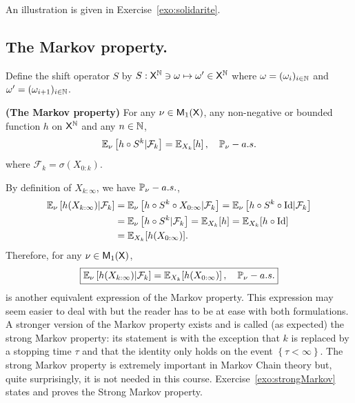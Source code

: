 \documentclass[english,graybox,envcountchap,envcountsame,sectrefs,shortlabels]{svmono}
\theoremstyle{style}
\begin{document}
An illustration is given in Exercise~\ref{exo:solidarite}.
\subsection{The Markov property.} 

Define the shift operator $S$ by $S:\mathsf{X}^{\mathbb{N}}\ni\omega\mapsto\omega'\in\mathsf{X}^{\mathbb{N}}$
where $\omega=(\omega_{i})_{i\in\mathbb{N}}$ and $\omega'=(\omega_{i+1})_{i\in\mathbb{N}}$.


\begin{theorem}
\textbf{(The Markov property)} For any $\nu\in\mathsf{M}_{1}(\mathsf{X})$, any
non-negative or bounded function $h$ on $\mathsf{X}^{\mathbb{N}}$ and any
$n\in\mathbb{N}$,
\begin{equation}
\mathbb{E}_{\nu}\left[h\circ S^{k}|\mathcal{F}_{k}\right]=\mathbb{E}_{X_{k}}[h]\,,\quad\mathbb{P}_{\nu}-a.s.\label{eq:MarkovProperty}
\end{equation}
where $\mathcal{F}_{k}=\sigma(X_{0:k})$.
\end{theorem}


By definition of $X_{k:\infty}$, we have $\mathbb{P}_{\nu}-a.s.$,
\begin{align*}
\mathbb{E}_{\nu}\left[h(X_{k:\infty})|\mathcal{F}_{k}\right] & =\mathbb{E}_{\nu}\left[h\circ S^{k}\circ X_{0:\infty}|\mathcal{F}_{k}\right]=\mathbb{E}_{\nu}\left[h\circ S^{k}\circ \mathrm{Id}|\mathcal{F}_{k}\right]\\
 & =\mathbb{E}_{\nu}\left[h\circ S^{k}|\mathcal{F}_{k}\right]=\mathbb{E}_{X_{k}}[h]=\mathbb{E}_{X_{k}}[h\circ \mathrm{Id}]\\
 & =\mathbb{E}_{X_{k}}[h(X_{0:\infty})].
\end{align*}
 Therefore, for any $\nu\in\mathsf{M}_{1}(\mathsf{X})$,
\[
\boxed{\mathbb{E}_{\nu}\left[h(X_{k:\infty})|\mathcal{F}_{k}\right]=\mathbb{E}_{X_{k}}[h(X_{0:\infty})]\,,\quad\mathbb{P}_{\nu}-a.s.}
\]
 is another equivalent expression of the Markov property. This expression may seem easier to deal with but the reader has to
be at ease with both formulations. A stronger version of the Markov
property exists and is called (as expected) the strong Markov property:
its statement is  with the exception that $k$
is replaced by a stopping time $\tau$ and that the identity only
holds on the event $\left\{ \tau<\infty\right\} $. The strong Markov
property is extremely important in Markov Chain theory but, quite
surprisingly, it is not needed in this course.  Exercise~\ref{exo:strongMarkov} states and proves the Strong Markov property.
\end{document}

